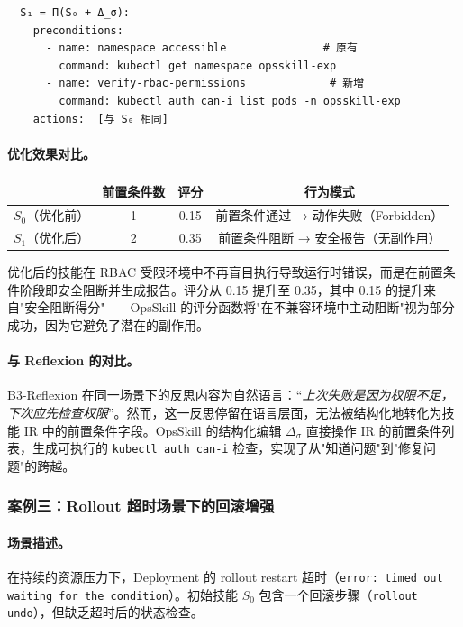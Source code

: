 \documentclass[11pt,a4paper]{ctexart}
\begin{document}
\begin{small}
\begin{verbatim}
  S₁ = Π(S₀ + Δ_σ):
    preconditions:
      - name: namespace accessible               # 原有
        command: kubectl get namespace opsskill-exp
      - name: verify-rbac-permissions             # 新增
        command: kubectl auth can-i list pods -n opsskill-exp
    actions:  [与 S₀ 相同]
\end{verbatim}
\end{small}

\paragraph{优化效果对比。}

\begin{center}
\small
\begin{tabular}{lccc}
\toprule
& \textbf{前置条件数} & \textbf{评分} & \textbf{行为模式} \\
\midrule
$S_0$（优化前） & 1 & 0.15 & 前置条件通过 → 动作失败（Forbidden） \\
$S_1$（优化后） & 2 & 0.35 & 前置条件阻断 → 安全报告（无副作用） \\
\bottomrule
\end{tabular}
\end{center}

\noindent 优化后的技能在 RBAC 受限环境中不再盲目执行导致运行时错误，而是在前置条件阶段即安全阻断并生成报告。评分从 0.15 提升至 0.35，其中 0.15 的提升来自"安全阻断得分"——OpsSkill 的评分函数将"在不兼容环境中主动阻断"视为部分成功，因为它避免了潜在的副作用。

\paragraph{与 Reflexion 的对比。}B3-Reflexion 在同一场景下的反思内容为自然语言：``\emph{上次失败是因为权限不足，下次应先检查权限}''。然而，这一反思停留在语言层面，无法被结构化地转化为技能 IR 中的前置条件字段。OpsSkill 的结构化编辑 $\Delta_\sigma$ 直接操作 IR 的前置条件列表，生成可执行的 \texttt{kubectl auth can-i} 检查，实现了从"知道问题"到"修复问题"的跨越。

\subsubsection{案例三：Rollout 超时场景下的回滚增强}

\paragraph{场景描述。}在持续的资源压力下，Deployment 的 rollout restart 超时（\texttt{error: timed out waiting for the condition}）。初始技能 $S_0$ 包含一个回滚步骤（\texttt{rollout undo}），但缺乏超时后的状态检查。
\end{document}

